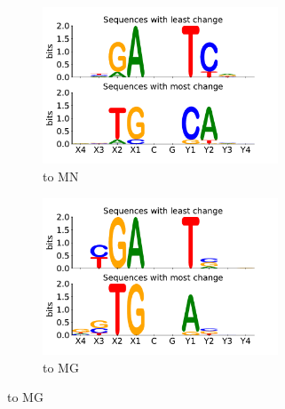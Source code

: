 \begin{figure}[H]
\begin{center}
  \begin{subfigure}{7cm}
    \centering\includegraphics[width=7cm]{images/epi_sensitivity_groundstate_seq_logo_MN_MAHAL.pdf}
    \centering\caption{\cpg to MN}
  \end{subfigure}
  \begin{subfigure}{7cm}
    \centering\includegraphics[width=7cm]{images/epi_sensitivity_groundstate_seq_logo_MG_Mahal.pdf}
    \centering\caption{\cpg to MG}
  \end{subfigure}


\end{center}
\end{figure}
